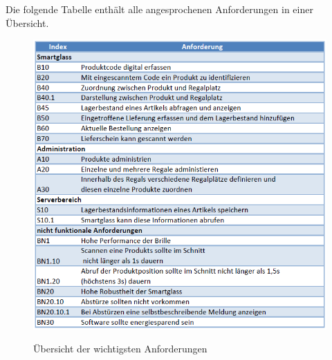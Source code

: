 Die folgende Tabelle enthält alle angesprochenen Anforderungen in einer Übersicht. 
\begin{figure}[H]
	\centering
	{\includegraphics[scale=0.9]{Bilder/Abbildungen/anforderungen_zusammenfassung.png}}
	\caption{Übersicht der wichtigsten Anforderungen}
	\label{fig:anforderungen_uebers}
\end{figure}